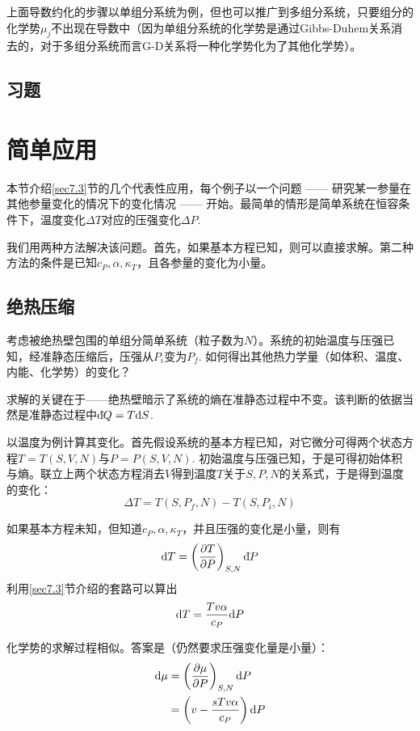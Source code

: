 上面导数约化的步骤以单组分系统为例，但也可以推广到多组分系统，只要组分的化学势$\mu_j$不出现在导数中（因为单组分系统的化学势是通过Gibbs-Duhem关系消去的，对于多组分系统而言G-D关系将一种化学势化为了其他化学势）。

\subsection*{习题}

\section{简单应用}
\label{sec7.4}
本节介绍\ref{sec7.3}节的几个代表性应用，每个例子以一个问题 —— 研究某一参量在其他参量变化的情况下的变化情况 —— 开始。最简单的情形是简单系统在恒容条件下，温度变化$\Delta T$对应的压强变化$\Delta P$.

我们用两种方法解决该问题。首先，如果基本方程已知，则可以直接求解。第二种方法的条件是已知$c_P, \alpha, \kappa_T$，且各参量的变化为小量。

\subsection*{绝热压缩}
考虑被绝热壁包围的单组分简单系统（粒子数为$N$）。系统的初始温度与压强已知，经准静态压缩后，压强从$P_i$变为$P_f$. 如何得出其他热力学量（如体积、温度、内能、化学势）的变化？

求解的关键在于——绝热壁暗示了系统的熵在准静态过程中不变。该判断的依据当然是准静态过程中$\mathrm d\hspace*{-0.1em}\bar{}\hspace*{0.08em} Q = T \mathrm{d} S$.

以温度为例计算其变化。首先假设系统的基本方程已知，对它微分可得两个状态方程$T = T(S, V, N)$与$P = P(S, V, N)$. 初始温度与压强已知，于是可得初始体积与熵。联立上两个状态方程消去$V$得到温度$T$关于$S, P, N$的关系式，于是得到温度的变化：
\begin{equation}
	\Delta T = T(S, P_f, N) - T(S, P_i, N)
\label{equ7.37}
\end{equation}

如果基本方程未知，但知道$c_P, \alpha, \kappa_T$，并且压强的变化是小量，则有
\begin{equation}
	\mathrm{d} T = \left( \frac{\partial T}{\partial P} \right)_{S, N} \mathrm d\hspace*{-0.1em}\bar{}\hspace*{0.08em} P 
\label{equ7.38}
\end{equation}
利用\ref{sec7.3}节介绍的套路可以算出
\begin{equation}
	\mathrm{d} T = \frac{Tv\alpha}{c_P} \mathrm{d} P 
\label{equ7.39}
\end{equation}

化学势的求解过程相似。答案是（仍然要求压强变化量是小量）：
\begin{align}
	\mathrm{d} \mu &= \left( \frac{\partial \mu}{\partial P} \right)_{S, N} \mathrm{d} P \label{equ7.40} \\
	&= \left( v - \frac{sTv\alpha}{c_P} \right) \mathrm{d} P \label{equ7.41}
\end{align}

